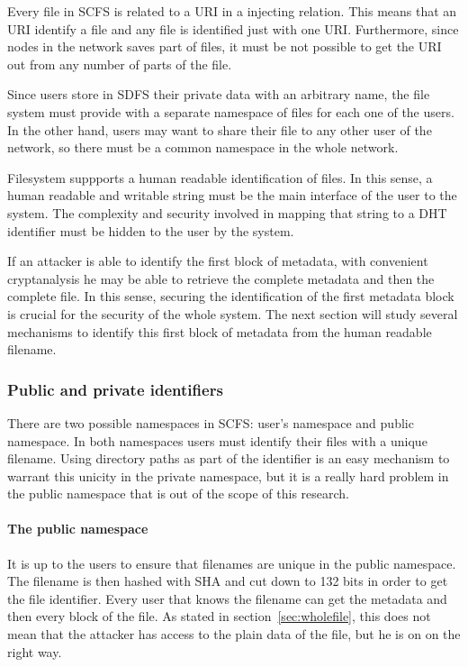 \documentclass{llncs}
\begin{document}
Every file in SCFS is related to a URI in a injecting relation. This means that
an URI identify a file and any file is identified just with one URI. Furthermore,
since nodes in the network saves part of files, it must be not possible to get
the URI out from any number of parts of the file.

Since users store in SDFS their private data with an arbitrary name, the file
system must provide with a separate namespace of files for each one of the
users. In the other hand, users may want to share their file to any other user
of the network, so there must be a common namespace in the whole network.

Filesystem suppports a human readable identification of files. In this sense, a
human readable and writable string must be the main interface of the user to the
system. The complexity and security involved in mapping that string to a DHT
identifier must be hidden to the user by the system.
 
If an attacker is able to identify the first block of metadata, with convenient cryptanalysis
he may be able to retrieve the complete metadata and then the complete file. In this sense,
securing the identification of the first metadata block is crucial for the security of the whole
system. The next section will study several mechanisms to identify this first block of metadata
from the human readable filename.

\subsubsection{Public and private identifiers}

There are two possible namespaces in SCFS: user's namespace and public namespace.
In both namespaces users must identify their files with a
unique filename. Using directory paths as part of the identifier is an easy mechanism to
warrant this unicity in the private namespace, but it is a really hard problem in the public
namespace that is out of the scope of this research.

\paragraph{The public namespace} It is up to the users to ensure that filenames are unique
in the public namespace. The filename is then hashed with SHA
and cut down to 132 bits in order to get the file identifier. Every user that knows
the filename can get the metadata and then every block of the file. As stated in
section~\ref{sec:wholefile}, this does not mean that the attacker has access to the
plain data of the file, but he is on on the right way.
\end{document}
